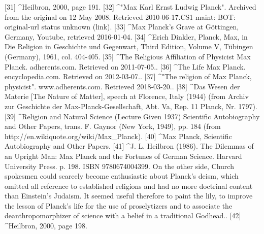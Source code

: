 [31]
^Heilbron, 2000, page 191.
[32]
^"Max Karl Ernst Ludwig Planck". Archived from the original on 12 May 2008. Retrieved 2010-06-17.CS1 maint: BOT: original-url status unknown (link).
[33]
^Max Planck's Grave at Göttingen, Germany, Youtube, retrieved 2016-01-04.
[34]
^Erich Dinkler, Planck, Max, in Die Religion in Geschichte und Gegenwart, Third Edition, Volume V, Tübingen (Germany), 1961, col. 404-405.
[35]
^The Religious Affiliation of Physicist Max Planck. adherents.com. Retrieved on 2011-07-05..
[36]
^The Life Max Planck. encyclopedia.com. Retrieved on 2012-03-07..
[37]
^"The religion of Max Planck, physicist". www.adherents.com. Retrieved 2018-03-20..
[38]
^Das Wesen der Materie [The Nature of Matter], speech at Florence, Italy (1944) (from Archiv zur Geschichte der Max-Planck-Gesellschaft, Abt. Va, Rep. 11 Planck, Nr. 1797).
[39]
^Religion and Natural Science (Lecture Given 1937) Scientific Autobiography and Other Papers, trans. F. Gaynor (New York, 1949), pp. 184 (from http://en.wikiquote.org/wiki/Max_Planck).
[40]
^Max Planck, Scientific Autobiography and Other Papers.
[41]
^J. L. Heilbron (1986). The Dilemmas of an Upright Man: Max Planck and the Fortunes of German Science. Harvard University Press. p. 198. ISBN 9780674004399. On the other side, Church spokesmen could scarcely become enthusiastic about Planck's deism, which omitted all reference to established religions and had no more doctrinal content than Einstein's Judaism. It seemed useful therefore to paint the lily, to improve the lesson of Planck's life for the use of proselytizers and to associate the deanthropomorphizer of science with a belief in a traditional Godhead..
[42]
^Heilbron, 2000, page 198.